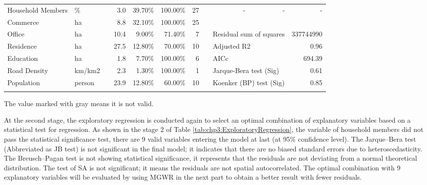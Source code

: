 \begin{sidewaystable}[htbp]
\begin{tabular}{llrrrrrcrrr}
		Household Members & \% & & 3.0 & 39.70\% & 100.00\% & 27 & & - & - & - \\
		
		\cmidrule{1-2}\cmidrule{4-7}\cmidrule{9-11}
		
		Commerce & ha & & \cellcolor[rgb]{ .8,  .8,  .8}8.8 & 32.10\% & 100.00\% & 25 & & &  \\
		
		Office & ha & & \cellcolor[rgb]{ .8,  .8,  .8}10.4 & \cellcolor[rgb]{ .8,  .8,  .8}9.00\% & \cellcolor[rgb]{ .8,  .8,  .8}71.40\% & 7 & & \multicolumn{2}{l}{Residual sum of squares} & 337744990 \\
		
		Residence & ha & & \cellcolor[rgb]{ .8,  .8,  .8}27.5 & 12.80\% & \cellcolor[rgb]{ .8,  .8,  .8}70.00\% & 10 & & \multicolumn{2}{l}{Adjusted R2} & 0.96 \\
		
		Education & ha & & 1.8 & \cellcolor[rgb]{ .8,  .8,  .8}7.70\% & 100.00\% & 6 & & \multicolumn{2}{l}{AICc} & 694.39 \\
		
		Road Density & km/km2 & & 2.3 & \cellcolor[rgb]{ .8,  .8,  .8}1.30\% & 100.00\% & 1 & & \multicolumn{2}{l}{Jarque-Bera test (Sig)} & 0.61 \\
		
		Population & person & & \cellcolor[rgb]{ .8,  .8,  .8}23.9 & 12.80\% & \cellcolor[rgb]{ .8,  .8,  .8}60.00\% & 10 & & \multicolumn{2}{l}{Koenker (BP) test (Sig)} & 0.85 \\
		
		\Xhline{1.5pt}
	\end{tabular}%

	\begin{description}
		\small
		\label{note:tab:chp3:ExploratoryRegression}
		\item[Note:]
		The value marked with gray means it is not valid.
	\end{description}
\end{sidewaystable}%

%
At the second stage, the exploratory regression is conducted again to select an optimal combination of explanatory variables based on a statistical test for regression. As shown in the stage 2 of Table \ref{tab:chp3:ExploratoryRegression}, the variable of household members did not pass the statistical significance test, there are 9 valid variables entering the model at last (at 95\% confidence level). The Jarque–Bera test (Abbreviated as JB test) is not significant in the final model; it indicates that there are no biased standard errors due to heteroscedasticity. The Breusch–Pagan test is not showing statistical significance, it represents that the residuals are not deviating from a normal theoretical distribution. The test of SA is not significant; it means the residuals are not spatial autocorrelated. The optimal combination with 9 explanatory variables will be evaluated by using MGWR in the next part to obtain a better result with fewer residuals.

